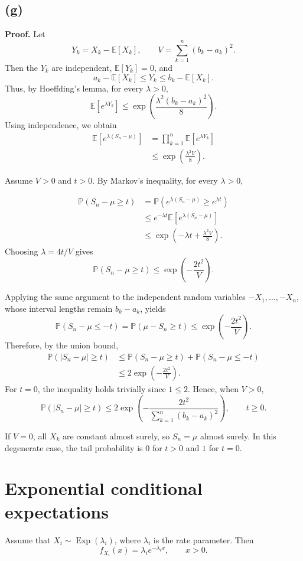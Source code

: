 \documentclass[11pt,a4paper]{article}
\begin{document}
\subsection*{(g)}
\textbf{Proof.}
Let
\[
Y_k=X_k-\mathbb{E}[X_k],
\qquad
V=\sum_{k=1}^{n}(b_k-a_k)^2.
\]
Then the \(Y_k\) are independent, \(\mathbb{E}[Y_k]=0\), and
\[
a_k-\mathbb{E}[X_k]\le Y_k\le b_k-\mathbb{E}[X_k].
\]
Thus, by Hoeffding's lemma, for every \(\lambda>0\),
\[
\mathbb{E}[e^{\lambda Y_k}]
\le \exp\!\left(\frac{\lambda^2(b_k-a_k)^2}{8}\right).
\]
Using independence, we obtain
\[
\begin{aligned}
\mathbb{E}[e^{\lambda(S_n-\mu)}]
&=\prod_{k=1}^{n}\mathbb{E}[e^{\lambda Y_k}]\\
&\le \exp\!\left(\frac{\lambda^2V}{8}\right).
\end{aligned}
\]

Assume \(V>0\) and \(t>0\). By Markov's inequality, for every
\(\lambda>0\),

\[
\begin{aligned}
\mathbb{P}(S_n-\mu\ge t)
&=\mathbb{P}\!\left(e^{\lambda(S_n-\mu)}
                   \ge e^{\lambda t}\right)\\
&\le e^{-\lambda t}\mathbb{E}[e^{\lambda(S_n-\mu)}]\\
&\le \exp\!\left(-\lambda t+\frac{\lambda^2V}{8}\right).
\end{aligned}
\]
Choosing \(\lambda=4t/V\) gives
\[
\mathbb{P}(S_n-\mu\ge t)
\le \exp\!\left(-\frac{2t^2}{V}\right).
\]

Applying the same argument to the independent random variables
\(-X_1,\ldots,-X_n\), whose interval lengths remain \(b_k-a_k\),
yields
\[
\mathbb{P}(S_n-\mu\le -t)
=\mathbb{P}(\mu-S_n\ge t)
\le \exp\!\left(-\frac{2t^2}{V}\right).
\]
Therefore, by the union bound,
\[
\begin{aligned}
\mathbb{P}(|S_n-\mu|\ge t)
&\le \mathbb{P}(S_n-\mu\ge t)
   +\mathbb{P}(S_n-\mu\le -t)\\
&\le 2\exp\!\left(-\frac{2t^2}{V}\right).
\end{aligned}
\]
For \(t=0\), the inequality holds trivially since \(1\le 2\).
Hence, when \(V>0\),
\[
\mathbb{P}(|S_n-\mu|\ge t)
\le
2\exp\!\left(
-\frac{2t^2}{\sum_{k=1}^{n}(b_k-a_k)^2}
\right),
\qquad t\ge 0.
\]

If \(V=0\), all \(X_k\) are constant almost surely, so
\(S_n=\mu\) almost surely. In this degenerate case, the tail
probability is \(0\) for \(t>0\) and \(1\) for \(t=0\).
\section{Exponential conditional expectations}
Assume that \(X_i \sim \operatorname{Exp}(\lambda_i)\), where \(\lambda_i\) is the rate parameter. Then
\[
f_{X_i}(x)=\lambda_i e^{-\lambda_i x}, \qquad x>0.
\]
\end{document}
